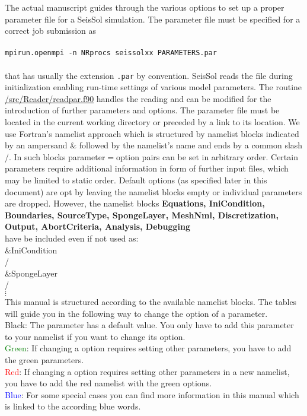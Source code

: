 \documentclass[12pt,twoside]{article}
\begin{document}
The actual manuscript guides through the various options to set up a proper parameter file for a SeisSol simulation.
The parameter file must be specified for a correct job submission as\\
\\
\texttt{mpirun.openmpi -n NRprocs seissolxx PARAMETERS.par}\\
\\
that has usually the extension {\tt*.par} by convention.
SeisSol reads the file during initialization enabling run-time settings of various model parameters.
The routine \url{/src/Reader/readpar.f90} handles the reading
and can be modified for the introduction of further parameters and options.
The parameter file must be located in the current working directory or preceded by a link to its location.
We use Fortran's namelist approach which is structured by namelist blocks indicated by an ampersand \&
followed by the namelist's name and ends by a common slash /.
In such blocks parameter$=$option pairs can be set in arbitrary order.
Certain parameters require additional information in form of further input files,
which may be limited to static order.
Default options (as specified later in this document) are opt by leaving the namelist blocks empty or individual parameters are dropped.
However, the namelist blocks
\textbf{Equations, IniCondition, Boundaries, SourceType, SpongeLayer, MeshNml, Discretization, Output, AbortCriteria, Analysis, Debugging}\\
have be included even if not used as:\\

\noindent \&IniCondition\\
/\\

\noindent \&SpongeLayer\\
/\\


\hspace{5mm}$\vdots$  \\


\noindent
This manual is structured according to the available namelist blocks.
The tables will guide you in the following way to change the option of a parameter.\\
Black: The parameter has a default value. You only have to add this parameter to your namelist if you want to change its option.\\
\textcolor{green}{Green}: If changing a option requires setting other parameters, you have to add the green parameters.\\
\textcolor{red}{Red}:  If changing a option requires setting other parameters in a new namelist,
you have to add the red namelist with the green options.\\
\textcolor{blue}{Blue}: For some special cases you can find more information in this manual which is linked to the according blue words.
\end{document}
